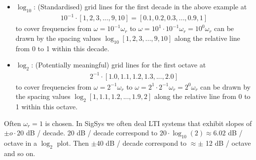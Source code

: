 \begin{center}
\end{center}



\begin{itemize}
  \item $\log_{10}$:
  (Standardised) grid lines for the first decade in the above example at
  \begin{align}
  10^{-1} \cdot [1,2,3,...,9,10] = [0.1,0.2,0.3,...,0.9,1]
  \end{align}
  to cover frequencies from $\omega=10^{-1} \omega_r$ to $\omega=10^1 \cdot 10^{-1} \omega_r= 10^0 \omega_r$
  can be drawn by the spacing values $\log_{10}[1,2,3,...,9,10]$
  along the relative line from 0 to 1 within this decade.
  \item $\log_{2}$:
  (Potentially meaningful) grid lines for the first octave at
  \begin{align}
  2^{-1} \cdot [1.0, 1.1, 1.2, 1.3,...,2.0]
  \end{align}
  to cover frequencies from $\omega=2^{-1} \omega_r$ to $\omega=2^1 \cdot 2^{-1} \omega_r = 2^0 \omega_r$
  can be drawn by the spacing values $\log_{2}[1,1.1,1.2,...,1.9,2]$
  along the relative line from 0 to 1 within this octave.
\end{itemize}
%
Often $\omega_r = 1$ is chosen.
In SigSys we often deal LTI systems that exhibit slopes of $\pm o \cdot 20$ dB / decade.
20 dB / decade correspond to $20\cdot \log_{10}(2) \approx 6.02$ dB / octave
in a $\log_2$ plot.
Then $\pm$40 dB / decade correspond to $\approx\pm$ 12 dB / octave and so on.





% 
% 
